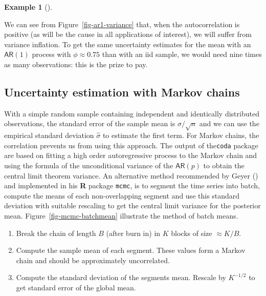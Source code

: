 \documentclass[
  11pt,
  letterpaper,
]{scrbook}
\providecommand{\tightlist}{%
  \setlength{\itemsep}{0pt}\setlength{\parskip}{0pt}}\usepackage{longtable,booktabs,array}
\theoremstyle{definition}
\theoremstyle{plain}
\theoremstyle{plain}
\theoremstyle{definition}
\newtheorem{example}{Example}[chapter]
\theoremstyle{definition}
\theoremstyle{remark}
\begin{document}
\begin{example}[]
\begin{figure}[ht!]
\end{figure}%

We can see from Figure~\ref{fig-ar1-variance} that, when the
autocorrelation is positive (as will be the cause in all applications of
interest), we will suffer from variance inflation. To get the same
uncertainty estimates for the mean with an \(\mathsf{AR}(1)\) process
with \(\phi \approx 0.75\) than with an iid sample, we would need nine
times as many observations: this is the prize to pay.

\end{example}

\subsection{Uncertainty estimation with Markov
chains}\label{uncertainty-estimation-with-markov-chains}

With a simple random sample containing independent and identically
distributed observations, the standard error of the sample mean is
\(\sigma/\sqrt{n}\) and we can use the empirical standard deviation
\(\widehat{\sigma}\) to estimate the first term. For Markov chains, the
correlation prevents us from using this approach. The output of
the\texttt{coda} package are based on fitting a high order
autoregressive process to the Markov chain and using the formula of the
unconditional variance of the \(\mathsf{AR}(p)\) to obtain the central
limit theorem variance. An alternative method recommended by Geyer
() and implemented in his \textbf{R}
package \texttt{mcmc}, is to segment the time series into batch, compute
the means of each non-overlapping segment and use this standard
deviation with suitable rescaling to get the central limit variance for
the posterior mean. Figure~\ref{fig-mcmc-batchmean} illustrate the
method of batch means.

\begin{enumerate}
\def\labelenumi{\arabic{enumi}.}
\tightlist
\item
  Break the chain of length \(B\) (after burn in) in \(K\) blocks of
  size \(\approx K/B\).
\item
  Compute the sample mean of each segment. These values form a Markov
  chain and should be approximately uncorrelated.
\item
  Compute the standard deviation of the segments mean. Rescale by
  \(K^{-1/2}\) to get standard error of the global mean.
\end{enumerate}
\end{document}
